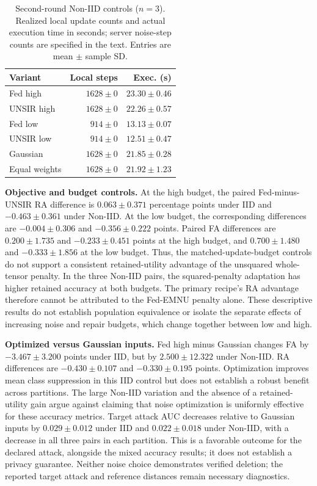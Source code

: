 \documentclass[software,article,submit,moreauthors]{Definitions/mdpi}
\begin{document}
\begin{table}[H]\centering\footnotesize\setlength{\tabcolsep}{4pt}
\caption{Second-round Non-IID controls ($n=3$). Realized local update counts and actual execution time in seconds; server noise-step counts are specified in the text. Entries are mean $\pm$ sample SD.}
\label{tab:round2-noniid-compute}
\begin{tabular}{lrr}\toprule Variant & Local steps & Exec. (s)\\\midrule
Fed high & $1628 \pm 0$ & $23.30 \pm 0.46$\\
UNSIR high & $1628 \pm 0$ & $22.26 \pm 0.57$\\
Fed low & $914 \pm 0$ & $13.13 \pm 0.07$\\
UNSIR low & $914 \pm 0$ & $12.51 \pm 0.47$\\
Gaussian & $1628 \pm 0$ & $21.85 \pm 0.28$\\
Equal weights & $1628 \pm 0$ & $21.92 \pm 1.23$\\
\bottomrule\end{tabular}\end{table}
\textbf{Objective and budget controls.} At the high budget, the paired
Fed-minus-UNSIR RA difference is $0.063\pm0.371$ percentage points under IID
and $-0.463\pm0.361$ under Non-IID. At the low budget, the corresponding
differences are $-0.004\pm0.306$ and $-0.356\pm0.222$ points. Paired FA
differences are $0.200\pm1.735$ and $-0.233\pm0.451$ points at the high
budget, and $0.700\pm1.480$ and $-0.333\pm1.856$ at the low budget.
Thus, the matched-update-budget controls do not support a consistent retained-utility
advantage of the unsquared whole-tensor penalty. In the three Non-IID pairs,
the squared-penalty adaptation has higher retained accuracy at both budgets.
The primary recipe's RA advantage therefore cannot be attributed to the
Fed-EMNU penalty alone. These descriptive results do not establish population
equivalence or isolate the separate effects of increasing noise and repair
budgets, which change together between low and high.

\textbf{Optimized versus Gaussian inputs.} Fed high minus Gaussian changes
FA by $-3.467\pm3.200$ points under IID, but by $2.500\pm12.322$ under
Non-IID. RA differences are $-0.430\pm0.107$ and $-0.330\pm0.195$ points.
Optimization improves mean class suppression in this IID control but does
not establish a robust benefit across partitions. The large Non-IID variation
and the absence of a retained-utility gain argue against claiming that noise
optimization is uniformly effective for these accuracy metrics. Target attack
AUC decreases relative to Gaussian inputs by $0.029\pm0.012$ under IID and
$0.022\pm0.018$ under Non-IID, with a decrease in all three pairs in each
partition. This is a favorable outcome for the declared attack, alongside the
mixed accuracy results; it does not establish a privacy guarantee. Neither noise choice demonstrates
verified deletion; the reported target attack and reference distances remain
necessary diagnostics.
\end{document}
